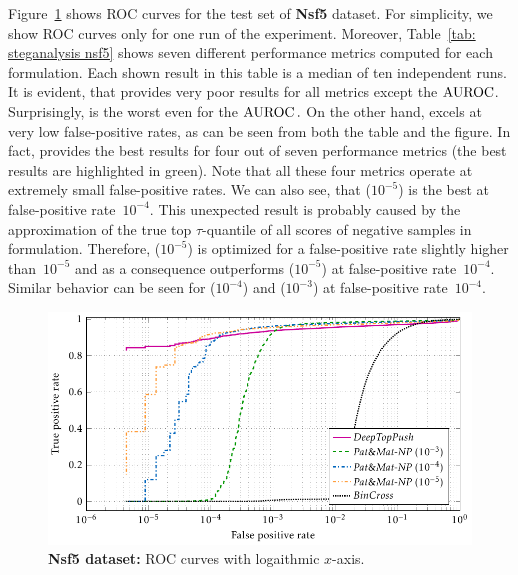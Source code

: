 Figure~\ref{fig: steganalysis nsf5} shows ROC curves for the test set of \textbf{Nsf5} dataset. For simplicity, we show ROC curves only for one run of the experiment. Moreover, Table~\ref{tab: steganalysis nsf5} shows seven different performance metrics computed for each formulation. Each shown result in this table is a median of ten independent runs. It is evident, that \BaseLine provides very poor results for all metrics except the $\operatorname{AUROC}$. Surprisingly, \BaseLine is the worst even for the $\operatorname{AUROC}.$ On the other hand, \DeepTopPush excels at very low false-positive rates, as can be seen from both the table and the figure. In fact, \DeepTopPush provides the best results for four out of seven performance metrics (the best results are highlighted in green). Note that all these four metrics operate at extremely small false-positive rates. We can also see, that \PatMatNP($10^{-5}$) is the best at false-positive rate~$10^{-4}$. This unexpected result is probably caused by the approximation of the true top $\tau$-quantile of all scores of negative samples in \PatMatNP formulation. Therefore, \PatMatNP($10^{-5}$) is optimized for a false-positive rate slightly higher than~$10^{-5}$ and as a consequence outperforms \PatMatNP($10^{-5}$) at false-positive rate~$10^{-4}$. Similar behavior can be seen for \PatMatNP($10^{-4}$) and \PatMatNP($10^{-3}$) at false-positive rate~$10^{-4}$.

\begin{figure}
  \centering
  \includegraphics{images/stego_nsft5.pdf}
  \caption{\textbf{Nsf5 dataset:} ROC curves with logaithmic $x$-axis.}
  \label{fig: steganalysis nsf5}
\end{figure}

